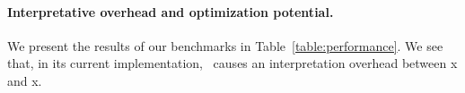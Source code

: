 \documentclass[preprint,authoryear,10pt]{sigplanconf}
\begin{document}
\paragraph{Interpretative overhead and optimization potential.}
We present the results of our benchmarks in Table~\ref{table:performance}. We see that, in its current implementation, \LoS\ causes an interpretation overhead between
\minInterpOver{}x and \maxInterpOver{}x.
%
%
%
%
%
\end{document}
